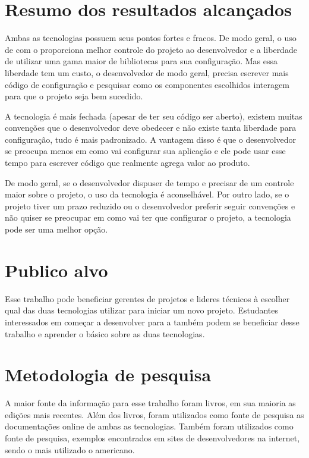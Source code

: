 \section{Resumo dos resultados alcançados}
\label{sec:resumoresultados}

Ambas as tecnologias possuem seus pontos fortes e fracos. De modo geral, o uso de  com o  proporciona melhor controle do projeto ao desenvolvedor e a liberdade de utilizar uma gama maior de bibliotecas para sua configuração. Mas essa liberdade tem um custo, o desenvolvedor de modo geral, precisa escrever mais código de configuração e pesquisar como os componentes escolhidos interagem para que o projeto seja bem sucedido.

A tecnologia  é mais fechada (apesar de ter seu código ser aberto), existem muitas convenções que o desenvolvedor deve obedecer e não existe tanta liberdade para configuração, tudo é mais padronizado. A vantagem disso é que o desenvolvedor se preocupa menos em como vai configurar sua aplicação e ele pode usar esse tempo para escrever código que realmente agrega valor ao produto.

De modo geral, se o desenvolvedor dispuser de tempo e precisar de um controle maior sobre o projeto, o uso da tecnologia  é aconselhável. Por outro lado, se o projeto tiver um prazo reduzido ou o desenvolvedor preferir seguir convenções e não quiser se preocupar em como vai ter que configurar o projeto, a tecnologia  pode ser uma melhor opção.
 
\section{Publico alvo}
\label{sec:publicalvo}

Esse trabalho pode beneficiar gerentes de projetos e lideres técnicos à escolher qual das duas tecnologias utilizar para iniciar um novo projeto. Estudantes interessados em começar a desenvolver para a  também podem se beneficiar desse trabalho e aprender o básico sobre as duas tecnologias.

\section{Metodologia de pesquisa}
\label{sec:metodologiapesquisa}

A maior fonte da informação para esse trabalho foram livros, em sua maioria as edições mais recentes. Além dos livros, foram utilizados como fonte de pesquisa as documentações online de ambas as tecnologias. Também foram utilizados como fonte de pesquisa, exemplos encontrados em sites de desenvolvedores na internet, sendo o mais utilizado o  americano.